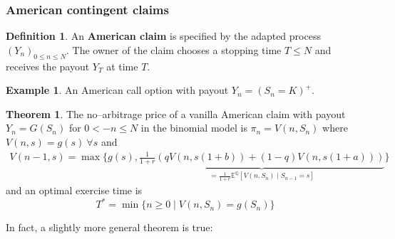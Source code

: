 \documentclass{article}
\theoremstyle{definition}
\newtheorem{theorem}{Theorem}[section]
\newtheorem{example}{Example}[section]
\newtheorem{defn}{Definition}[section]
\begin{document}
\subsubsection*{American contingent claims}
\begin{defn}
    An \textbf{American claim} is specified by the adapted process $(Y_n)_{0\le n\le N}$. The owner of the claim chooses a stopping time $T\le N$ and receives the payout $Y_T$ at time $T$.
\end{defn}
\begin{example}
    An American call option with payout $Y_n = (S_n=K)^+$.
\end{example}
\begin{theorem}
    The no--arbitrage price of a vanilla American claim with payout $Y_n=G(S_n)$ for $0<-n\le N$ in the binomial model is $\pi_n = V(n,S_n)$ where $V(n,s)=g(s) ~\forall s$ and 
    \begin{align*}
        V(n-1,s) = \max \{g(s), \underbrace{\frac{1}{1+r}\left(qV(n,s(1+b)) + (1-q)V(n,s(1+a))\right)}_{=\frac{1}{1+r}\mathbb{E}^\mathbb{Q}[V(n,S_n)\mid S_{n-1}=s]}\}
    \end{align*}
    and an optimal exercise time is \[
    T^* = \min \{n\ge 0 \mid V(n,S_n)=g(S_n)\}
    \]
\end{theorem}


In fact, a slightly more general theorem is true:
\end{document}

